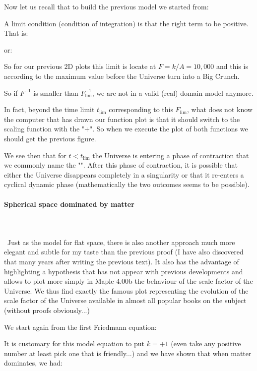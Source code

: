 	Now let us recall that to build the previous model we started from:
	
	A limit condition (condition of integration) is that the right term to be positive. That is:
	
	or:
	
	So for our previous $2$D plots this limit is locate at $F=k/A=10,000$ and this is according to the maximum value before the Universe turn into a Big Crunch.
	
	So if $F^{-1}$ is smaller than $F_{\lim}^{-1}$, we are not in a valid (real) domain model anymore.
	
	In fact, beyond the time limit $t_{\lim}$ corresponding to this $F_{\lim}$, what does not know the computer that has drawn our function plot is that it should switch to the scaling function with the "$+$". So when we execute the plot of both functions we should get the previous figure.
	
	We see then that for $t<t_{\lim}$ the Universe is entering a phase of contraction that we commonly name the "". After this phase of contraction, it is possible that either the Universe disappears completely in a singularity or that it re-enters a cyclical dynamic phase (mathematically the two outcomes seems to be possible).
	
	\paragraph{Spherical space dominated by matter}\mbox{}\\\\\
	Just as the model for flat space, there is also another approach much more elegant and subtle for my taste than the previous proof (I have also discovered that many years after writing the previous text). It also has the advantage of highlighting a hypothesis that has not appear with previous developments and allows to plot more simply in Maple 4.00b the behaviour of the scale factor of the Universe. We thus find exactly the famous plot representing the evolution of the scale factor of the Universe available in almost all popular books on the subject (without proofs obviously...)

	We start again from the first Friedmann equation:
	
	It is customary for this model equation to put $k=+1$ (even take any positive number at least pick one that is friendly...) and we have shown that when matter dominates, we had:
	
